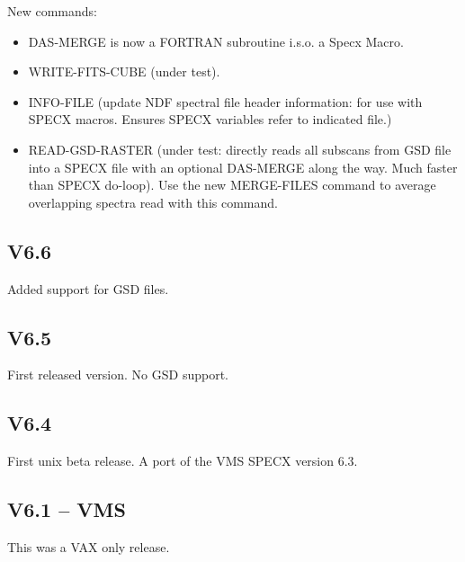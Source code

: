 \documentclass[twoside,11pt]{article}
\newcommand{\xref}[3]{#1}
\renewcommand{\_}{\texttt{\symbol{95}}}
\begin{document}
New commands:
\begin{itemize}
\item DAS-MERGE is now a FORTRAN subroutine i.s.o. a Specx Macro.

\item WRITE-FITS-CUBE (under test).

\item INFO-FILE  (update NDF spectral file header information: for
         use with SPECX macros. Ensures SPECX variables refer to
         indicated file.)

\item READ-GSD-RASTER (under test: directly reads all subscans
         from GSD file into a SPECX file with an optional DAS-MERGE
         along the way. Much faster than SPECX do-loop). Use the
         new MERGE-FILES command to average overlapping spectra
         read with this command.

\end{itemize}

\subsection{V6.6}

Added support for \xref{GSD}{sun229}{} files.

\subsection{V6.5}

First released version. No \xref{GSD}{sun229}{} support.

\subsection{V6.4}

First unix beta release. A port of the VMS SPECX version 6.3.

\subsection{V6.1 -- VMS}

This was a VAX only release.
\end{document}
